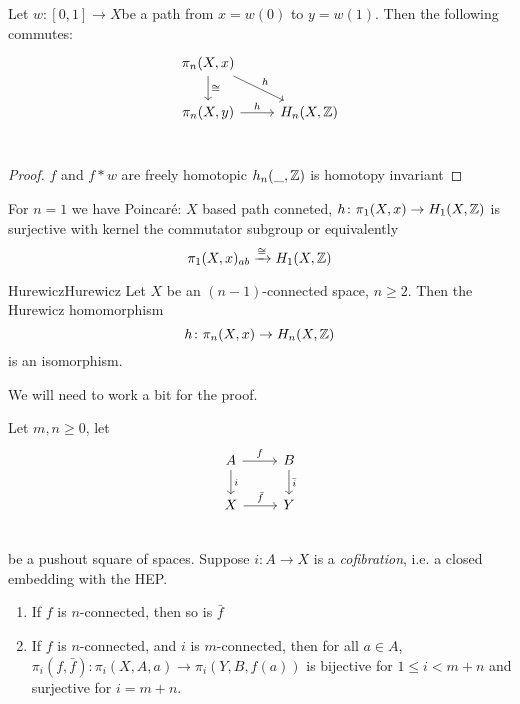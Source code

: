 \documentclass[language=english]{TemplateLecture}
\begin{document}
\begin{lem}{}{}
    Let \(w\colon [0,1]\to X\)be a path from \(x = w(0)\) to \(y = w(1)\). Then the following commutes:
    \[\begin{tikzcd}
        \pi_n(X,x) \ar[d, "\cong"] \ar[rd, "h"] & \\
        \pi_n(X,y) \ar[r, "h"] & H_n(X, \iz) \\ 
    \end{tikzcd}\]
\end{lem}

\begin{proof}
    \(f\) and \(f *w\) are freely homotopic \(h_n(\_, \mathbb{Z})\) is homotopy invariant
\end{proof}

For \(n = 1\) we have Poincaré: \(X\) based path conneted, \(h\colon \pi_1(X,x)\to H_1(X,\mathbb{Z})\) is surjective with kernel the commutator subgroup or equivalently
\[\pi_1(X,x)_{ab} \xrightarrow{\cong} H_1(X,\mathbb{Z})\]

\begin{thm}{Hurewicz}{Hurewicz}
    Let \(X\) be an \((n-1)\)-connected space, \(n\geq 2\). Then the Hurewicz homomorphism
    \[h\colon\pi_n(X,x) \to H_n(X,\mathbb{Z})\]
    is an isomorphism.
\end{thm}

We will need to work a bit for the proof.

\begin{proposition}
    Let \(m,n \geq 0\), let
    \[\begin{tikzcd}
        A \ar[r, "f"] \ar[d, "i"] & B \ar[d, "\bar i"]\\
        X \ar[r, "\bar f"] & Y \\
    \end{tikzcd}\]
    be a pushout square of spaces. Suppose \(i\colon A \to X\) is a \emph{cofibration}, i.e. a closed embedding with the HEP.
    \begin{enumerate}
        \item If \(f\) is \(n\)-connected, then so is \(\bar f\)
        \item If \(f\) is \(n\)-connected, and \(i\) is \(m\)-connected, then for all \(a \in A\), \(\pi_i(f, \bar f) \colon \pi_i(X,A, a) \to \pi_i(Y, B, f(a))\) is bijective for \(1 \leq i < m+n\) and surjective for \(i = m+n\).
    \end{enumerate}
\end{proposition}
\end{document}
